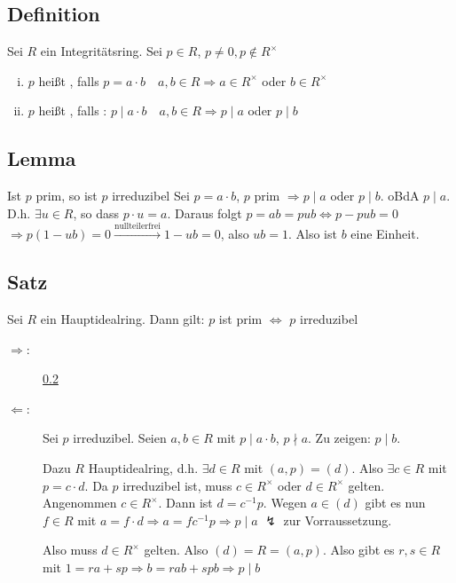 \subsection[Definition von irreduzibel und prim in Integritätsringen]{Definition} %
\label{sub:912}
Sei $R$ ein Integritätsring. Sei $p \in R$, $p \not= 0, p \not\in R^\times$
\begin{enumerate}[(i)]
	\item $p$ heißt , falls $p=a \cdot b \quad  a,b \in R \Rightarrow a \in R^\times$ oder $b \in R^\times$
	\item $p$ heißt , falls : $p \mid a \cdot b  \quad  a,b \in R \Rightarrow p \mid a$ oder $p \mid b$ 
\end{enumerate}

\subsection[Lemma: prim impliziert irreduzibel]{Lemma} %
\label{sub:913}
Ist $p$ prim, so ist $p$ irreduzibel
Sei $p =a \cdot b$, $p$ prim $\Rightarrow p \mid a$ oder $p \mid b$. oBdA $p \mid a$. D.h. $\exists u \in R$, so dass $p \cdot u = a$. Daraus folgt $p=ab=pub \Leftrightarrow p - pub = 0$
$\Rightarrow p(1- ub) = 0 \xrightarrow{\text{nullteilerfrei}}  1- ub = 0$, also $ub = 1$. Also ist $b$ eine Einheit. \bewende

\subsection[Satz: In Hauptidealringen ist prim äquivalent zu irreduzibel]{Satz} %
\label{sub:914}
Sei $R$ ein Hauptidealring. Dann gilt: $p$ ist prim $\iff$ $p$ irreduzibel
\begin{description}
	\item[\glqq$\Rightarrow $\grqq:] \ref{sub:913}
	\item[\glqq$\Leftarrow $\grqq:] Sei $p$ irreduzibel. Seien $a,b \in R$ mit $p \mid a \cdot b$, $p \nmid a$. Zu zeigen: $p \mid b$.
	
	Dazu $R$ Hauptidealring, d.h. $\exists d \in R$ mit $(a,p)= (d)$. Also $\exists c \in R$ mit $p=c \cdot d$. Da $p$ irreduzibel ist, muss $c \in R^\times$ oder 
	$d \in R^\times$ gelten. Angenommen $c \in R^\times$. Dann ist $d= c ^{-1} p$. Wegen $a \in (d)$ gibt es nun $f \in R$ mit $a= f \cdot d \Rightarrow a = f c ^{-1} p \Rightarrow p \mid a $ {\large $\lightning$} zur Vorraussetzung. 
	
	Also muss $d \in R^\times$ gelten. Also $(d)= R= (a,p)$. Also gibt es $r,s \in R$ mit $1= ra + sp \Rightarrow b = rab + spb \Rightarrow p \mid b$ \bewende
\end{description}

